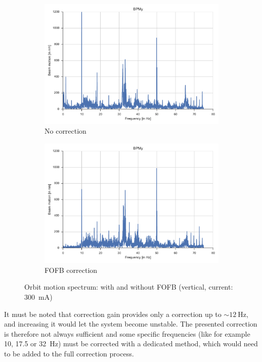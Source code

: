 \begin{figure}
    \centering
    \begin{subfigure}[b]{0.8\textwidth}
        \includegraphics[width=\linewidth]{img/fft_no_corr}
        \caption{No correction}
    \end{subfigure}
    
    \begin{subfigure}[b]{0.8\textwidth}
        \includegraphics[width=\linewidth]{img/fft_fofb}
        \caption{FOFB correction}
    \end{subfigure}
    \caption{\label{fig:compare_fofb}Orbit motion spectrum: with and without FOFB (vertical, current: \SI{300}{\milli\ampere})}
\end{figure}

It must be noted that correction gain provides only a correction up to $\sim\!\SI{12}{\hertz}$, and increasing it would let the system become unstable. The presented correction is therefore not always sufficient and some specific frequencies (like for example 10, 17.5 or \SI{32}{\hertz}) must be corrected with a dedicated method, which would need to be added to the full correction process.

